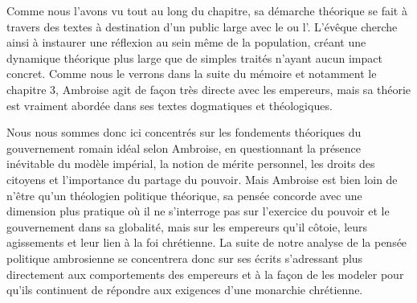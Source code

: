 Comme nous l'avons vu tout au long du chapitre, sa démarche théorique se fait à travers des textes à destination d'un public large avec le  ou l'. L'évêque cherche ainsi à instaurer une réflexion au sein même de la population, créant une dynamique théorique plus large que de simples traités n'ayant aucun impact concret. Comme nous le verrons dans la suite du mémoire et notamment le chapitre 3, Ambroise agit de façon très directe avec les empereurs, mais sa théorie est vraiment abordée dans ses textes dogmatiques et théologiques.

\bigskip

Nous nous sommes donc ici concentrés sur les fondements théoriques du gouvernement romain idéal selon Ambroise, en questionnant la présence inévitable du modèle impérial, la notion de mérite personnel, les droits des citoyens et l'importance du partage du pouvoir. Mais Ambroise est bien loin de n'être qu'un théologien politique théorique, sa pensée concorde avec une dimension plus pratique où il ne s'interroge pas sur l'exercice du pouvoir et le gouvernement dans sa globalité, mais sur les empereurs qu'il côtoie, leurs agissements et leur lien à la foi chrétienne. La suite de notre analyse de la pensée politique ambrosienne se concentrera donc sur ses écrits s'adressant plus directement aux comportements des empereurs et à la façon de les modeler pour qu'ils continuent de répondre aux exigences d'une monarchie chrétienne.
